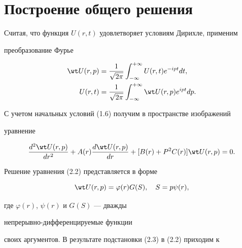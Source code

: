  


\section{Построение общего решения} 


 


Считая, что функция $U(r,t)$ удовлетворяет условиям Дирихле, применим 


преобразование Фурье 


\begin{equation} 


\begin{split} 


\wt U(r,p)&=\frac{1}{\sqrt{2\pi}}\int^{+\infty}_{-\infty} 


U(r,t)e^{-ipt}dt, \\ 


U(r,t)&=\frac{1}{\sqrt{2\pi}}\int^{+\infty}_{-\infty} 


\wt U(r,p)e^{ipt}dp. 


\end{split} 


\end{equation} 


С учетом начальных условий (1.6) получим в пространстве изображений 


уравнение 


\begin{equation} 


\frac{d^2\wt U(r,p)}{dr^2}+A(r) 


\frac{d\wt U(r,p)}{dr}+[B(r)+P{}^2C(r)] 


\wt U(r,p)=0. 


\end{equation} 


 


Решение уравнения (2.2) представляется в форме 


\begin{equation} 


\wt U(r,p)=\varphi(r)G(S),\quad S=p\psi(r), 


\end{equation} 


где $\varphi(r)$, $\psi(r)$ и $G(S)$ --- дважды 


непрерывно-дифференцируемые функции 


своих аргументов. В результате подстановки (2.3) в (2.2) приходим к 


